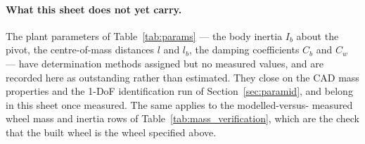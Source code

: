 \paragraph{What this sheet does not yet carry.} The plant parameters of
Table~\ref{tab:params} --- the body inertia $I_b$ about the pivot, the
centre-of-mass distances $l$ and $l_b$, the damping coefficients $C_b$ and
$C_w$ --- have determination methods assigned but no measured values, and are
recorded here as outstanding rather than estimated. They close on the CAD mass
properties and the 1-DoF identification run of Section~\ref{sec:paramid}, and
belong in this sheet once measured. The same applies to the modelled-versus-
measured wheel mass and inertia rows of Table~\ref{tab:mass_verification},
which are the check that the built wheel is the wheel specified above.

